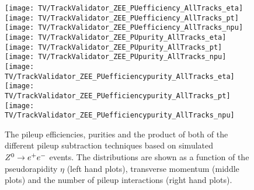\begin{figure}[Ht]
    \centering
    \texttt{[image: TV/TrackValidator\_ZEE\_PUefficiency\_AllTracks\_eta]}
    \texttt{[image: TV/TrackValidator\_ZEE\_PUefficiency\_AllTracks\_pt]}
    \texttt{[image: TV/TrackValidator\_ZEE\_PUefficiency\_AllTracks\_npu]}
    \\
    \texttt{[image: TV/TrackValidator\_ZEE\_PUpurity\_AllTracks\_eta]}
    \texttt{[image: TV/TrackValidator\_ZEE\_PUpurity\_AllTracks\_pt]}
    \texttt{[image: TV/TrackValidator\_ZEE\_PUpurity\_AllTracks\_npu]}
    \\
    \texttt{[image: TV/TrackValidator\_ZEE\_PUefficiencypurity\_AllTracks\_eta]}
    \texttt{[image: TV/TrackValidator\_ZEE\_PUefficiencypurity\_AllTracks\_pt]}
    \texttt{[image: TV/TrackValidator\_ZEE\_PUefficiencypurity\_AllTracks\_npu]}
    \caption[Pileup efficiencies, purities and their product of the different pileup subtraction techniques based on simulated $\Zz\rightarrow\EE$ events]{The pileup efficiencies, purities and the product of both of the different pileup subtraction techniques based on simulated $\Zz\rightarrow\EE$ events. The distributions are shown as a function of the pseudorapidity $\eta$ (left hand plots), transverse momentum (middle plots) and the number of pileup interactions (right hand plots). \label{plot:TACOAACPZEEPileup}}
\end{figure}



